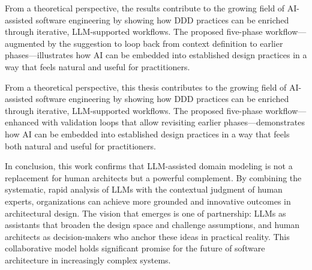 From a theoretical perspective, the results contribute to the growing field of AI-assisted software engineering by showing how DDD practices can be enriched through iterative, LLM-supported workflows. The proposed five-phase workflow—augmented by the suggestion to loop back from context definition to earlier phases—illustrates how AI can be embedded into established design practices in a way that feels natural and useful for practitioners.

From a theoretical perspective, this thesis contributes to the growing field of AI-assisted software engineering by showing how DDD practices can be enriched through iterative, LLM-supported workflows. The proposed five-phase workflow—enhanced with validation loops that allow revisiting earlier phases—demonstrates how AI can be embedded into established design practices in a way that feels both natural and useful for practitioners.

In conclusion, this work confirms that LLM-assisted domain modeling is not a replacement for human architects but a powerful complement. By combining the systematic, rapid analysis of LLMs with the contextual judgment of human experts, organizations can achieve more grounded and innovative outcomes in architectural design. The vision that emerges is one of partnership: LLMs as assistants that broaden the design space and challenge assumptions, and human architects as decision-makers who anchor these ideas in practical reality. This collaborative model holds significant promise for the future of software architecture in increasingly complex systems.
